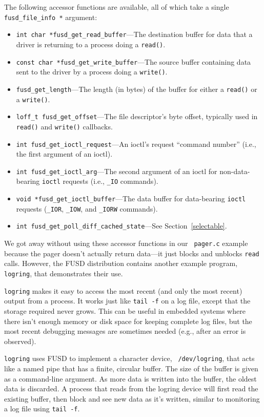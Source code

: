 \documentclass{article}
\begin{document}
The following accessor functions are available, all of which take a
single {\tt fusd\_file\_info *} argument:
\begin{itemize}
\item {\tt int char *fusd\_get\_read\_buffer}---The destination buffer
for data that a driver is returning to a process doing a {\tt read()}.
\item {\tt const char *fusd\_get\_write\_buffer}---The source buffer
containing data sent to the driver by a process doing a {\tt write()}.
\item {\tt fusd\_get\_length}---The length (in bytes) of the buffer
for either a {\tt read()} or a {\tt write()}.
\item {\tt loff\_t fusd\_get\_offset}---The file descriptor's byte
offset, typically used in {\tt read()} and {\tt write()} callbacks.
\item {\tt int fusd\_get\_ioctl\_request}---An ioctl's request
``command number'' (i.e., the first argument of an ioctl).
\item {\tt int fusd\_get\_ioctl\_arg}---The second argument of an
ioctl for non-data-bearing {\tt ioctl} requests (i.e., {\tt \_IO}
commands).
\item {\tt void *fusd\_get\_ioctl\_buffer}---The data buffer for
data-bearing {\tt ioctl} requests ({\tt \_IOR}, {\tt \_IOW}, and
{\tt \_IORW} commands).
\item {\tt int fusd\_get\_poll\_diff\_cached\_state}---See
Section~\ref{selectable}.
\end{itemize}

We got away without using these accessor functions in our {\tt
pager.c} example because the pager doesn't actually return data---it
just blocks and unblocks {\tt read} calls.  However, the FUSD
distribution contains another example program, {\tt logring}, that
demonstrates their use.

{\tt logring} makes it easy to access the most recent (and only the most
recent) output from a process. It works just like {\tt tail -f} on a
log file, except that the storage required never grows. This can be
useful in embedded systems where there isn't enough memory or disk
space for keeping complete log files, but the most recent debugging
messages are sometimes needed (e.g., after an error is observed).

{\tt logring} uses FUSD to implement a character device, {\tt
/dev/logring}, that acts like a named pipe that has a finite, circular
buffer.  The size of the buffer is given as a command-line argument.
As more data is written into the buffer, the oldest data is discarded.
A process that reads from the logring device will first read the
existing buffer, then block and see new data as it's written, similar
to monitoring a log file using {\tt tail -f}.
\end{document}

